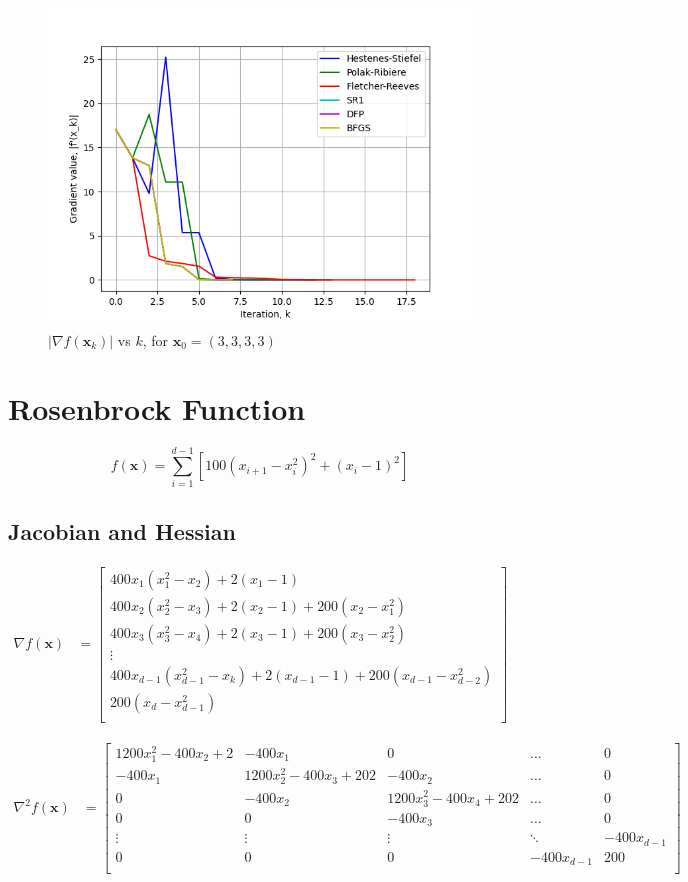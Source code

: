 \documentclass[a4paper]{article}
\begin{document}
\begin{figure}[H]
    \centering
    \includegraphics[width=.65\textwidth]{styblinski_tang_function_grad.png}
    \caption{$|\nabla f(\textbf{x}_k)|$ vs $k$, for $\textbf{x}_0 = (3, 3, 3, 3)$}
\end{figure}

\section{Rosenbrock Function}

$$f(\textbf{x}) = \sum_{i=1}^{d-1} [ 100(x_{i+1} - x_i^2)^2 + (x_i - 1)^2 ]$$

\subsection{Jacobian and Hessian}

\begin{align*}
\nabla f(\textbf{x}) &=
    \begin{bmatrix}
        400 x_1 (x_1^2 - x_2) + 2 (x_1 - 1) \\
        400 x_2 (x_2^2 - x_3) + 2 (x_2 - 1) + 200 (x_2 - x_1^2) \\
        400 x_3 (x_3^2 - x_4) + 2 (x_3 - 1) + 200 (x_3 - x_2^2) \\
        \vdots \\
        400 x_{d-1} (x_{d-1}^2 - x_k) + 2 (x_{d-1} - 1) + 200 (x_{d-1} - x_{d-2}^2) \\
        200 (x_d - x_{d-1}^2) \\
    \end{bmatrix}
\end{align*}

\begin{align*}
\nabla^2 f(\textbf{x}) &=
    \begin{bmatrix}
        1200 x_1^2 - 400 x_2 + 2 & -400 x_1 & 0 & \dots & 0 \\
        -400 x_1 & 1200 x_2^2 - 400 x_3 + 202 & -400 x_2 & \dots & 0 \\
        0 & -400 x_2 & 1200 x_3^2 - 400 x_4 + 202 & \dots & 0 \\
        0 & 0 & -400 x_3 & \dots & 0 \\
        \vdots & \vdots & \vdots & \ddots & -400 x_{d-1} \\
        0 & 0 & 0 & -400 x_{d-1} & 200 \\
    \end{bmatrix}
\end{align*}
\end{document}
